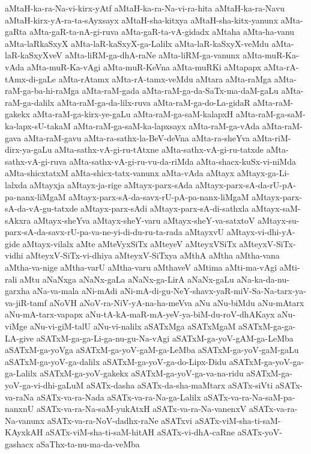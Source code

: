 {aMtaH-ka-ra-Na-vi-kirx-yAtf
aMtaH-ka-ra-Na-vi-ra-hita
aMtaH-ka-ra-Navu
aMtaH-kirx-yA-ra-ta-sAyxsayx
aMtaH-sha-kitxya
aMtaH-sha-kitx-yanunx
aMta-gaRta
aMta-gaR-ta-nA-gi-ruva
aMta-gaR-ta-vA-gidadx
aMtaha
aMta-ha-vanu
aMta-laRkaSxyX
aMta-laR-kaSxyX-ga-Lalilx
aMta-laR-kaSxyX-veMdu
aMta-laR-kaSxyXveV
aMta-liRM-ga-dhA-raNe
aMta-liRM-ga-vanunx
aMta-muR-Ka-vAda
aMta-muR-Ka-vAgi
aMta-muR-KeVna
aMta-muRKi
aMtapapx
aMta-rA-tAmx-di-gaLe
aMta-rAtamx
aMta-rA-tamx-veMdu
aMtara
aMta-raMga
aMta-raM-ga-ba-hi-raMga
aMta-raM-gada
aMta-raM-ga-da-SaTx-ma-daM-gaLu
aMta-raM-ga-dalilx
aMta-raM-ga-da-lilx-ruva
aMta-raM-ga-do-La-gidaR
aMta-raM-gakekx
aMta-raM-ga-kirx-ye-gaLu
aMta-raM-ga-saM-kalapxH
aMta-raM-ga-saM-ka-lapx-sU-takaM
aMta-raM-ga-saM-ka-lapxsayx
aMta-raM-ga-vAda
aMta-raM-gava
aMta-raM-gavu
aMta-ra-sathx-la-BeV-deVna
aMta-ra-sheYva
aMta-riM-dirx-ya-gaLu
aMta-sathx-vA-gi-ru-tAtxne
aMta-sathx-vA-gi-ru-tatxde
aMta-sathx-vA-gi-ruva
aMta-sathx-vA-gi-ru-vu-da-riMda
aMta-shacx-kuSx-vi-niMda
aMta-shicxtatxM
aMta-shicx-tatx-vanunx
aMta-vAda
aMtayx
aMtayx-ga-Li-lalxda
aMtayxja
aMtayx-ja-rige
aMtayx-parx-sAda
aMtayx-parx-sA-da-rU-pA-pa-nanx-liMgaM
aMtayx-parx-sA-da-savx-rU-pA-pa-nanx-liMgaM
aMtayx-parx-sA-da-vA-gu-tatxde
aMtayx-parx-sAdi
aMtayx-parx-sA-di-sathxla
aMtayx-saM-sAkxra
aMtayx-sheYva
aMtayx-sheY-varu
aMtayx-sheY-va-satxtoV
aMtayx-su-parx-sA-da-savx-rU-pa-va-ne-yi-di-du-ru-ta-rada
aMtayxvU
aMtayx-vi-dhi-yA-gide
aMtayx-vilalx
aMte
aMteVyxSiTx
aMteyeV
aMteyxVSiTx
aMteyxV-SiTx-vidhi
aMteyxV-SiTx-vi-dhiya
aMteyxV-SiTxya
aMthA
aMtha
aMtha-vana
aMtha-va-nige
aMtha-varU
aMtha-varu
aMthaveV
aMtima
aMti-ma-vAgi
aMti-rali
aMtu
aNaNxga
aNaNx-gaLa
aNaNx-ga-LirA
aNaNx-gaLu
aNa-ka-da-nu-garxha
aNa-va-mala
aNi-mAdi
aNi-mA-di-gu-NeY-shavx-yaR-miV-Sa-Na-tarx-ya-va-jiR-tamf
aNoVH
aNoV-ra-NiV-yA-na-ha-meVva
aNu
aNu-biMdu
aNu-mAtarx
aNu-mA-tarx-vapapx
aNu-tA-kA-maR-mA-yeV-ya-biM-du-roV-dhAKayx
aNu-viMge
aNu-vi-giM-talU
aNu-vi-nalilx
aSATxMga
aSATxMgaM
aSATxM-ga-ga-LA-give
aSATxM-ga-ga-Li-ga-nu-gu-Na-vAgi
aSATxM-ga-yoV-gAM-ga-LeMba
aSATxM-ga-yoVga
aSATxM-ga-yoV-gaM-ga-LeMba
aSATxM-ga-yoV-gaM-gaLu
aSATxM-ga-yoV-ga-dalilx
aSATxM-ga-yoV-ga-do-Lipx-Didu
aSATxM-ga-yoV-ga-ga-Lalilx
aSATxM-ga-yoV-gakekx
aSATxM-ga-yoV-ga-va-na-ridu
aSATxM-ga-yoV-ga-vi-dhi-gaLuM
aSATx-dasha
aSATx-da-sha-maMtarx
aSATx-siVti
aSATx-va-raNa
aSATx-va-ra-Nada
aSATx-va-ra-Na-ga-Lalilx
aSATx-va-ra-Na-saM-pa-nanxnU
aSATx-va-ra-Na-saM-yukAtxH
aSATx-va-ra-Na-vanenxV
aSATx-va-ra-Na-vanunx
aSATx-va-ra-NoV-dadhx-raNe
aSATxvi
aSATx-viM-sha-ti-saM-KAyxkAH
aSATx-viM-sha-ti-saM-hitAH
aSATx-vi-dhA-caRne
aSATx-yoV-gashacx
aSaThx-ta-nu-ma-da-veMba
}
